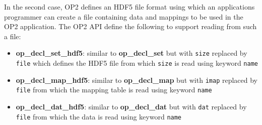 \documentclass[11pt]{article}
\begin{document}
\noindent In the second case, OP2 defines an HDF5 file format using which an applications programmer can create a
file containing data and mappings to be used in the OP2 application. The OP2 API define the following to support
reading from such a file:
\begin{itemize}
\item {\bf op\_decl\_set\_hdf5}: similar to {\bf op\_decl\_set} but with {\tt size}
replaced by {\tt file} which defines the HDF5 file from which {\tt size}
is read using keyword {\tt name}

\item {\bf op\_decl\_map\_hdf5}: similar to {\bf op\_decl\_map} but with {\tt imap}
replaced by {\tt file} from which the mapping table is read using keyword {\tt name}

\item {\bf op\_decl\_dat\_hdf5}: similar to {\bf op\_decl\_dat} but with {\tt dat}
replaced by {\tt file} from which the data is read using keyword {\tt name}
\end{itemize}
\newpage


\end{document}
